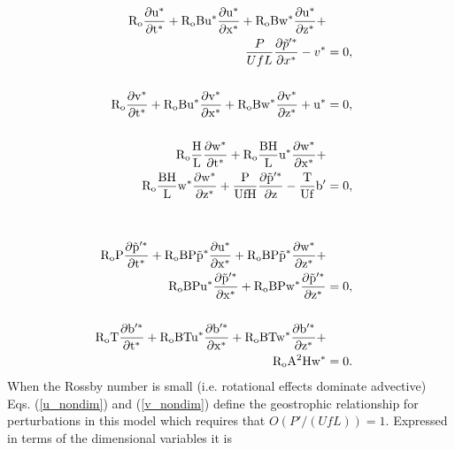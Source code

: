 \documentclass[times]{qjrms4}
\begin{document}
\begin{subequations} \label{non-dimensional}
\begin{align}
\rm{R_o}  \frac{\partial u^*}{\partial t^*} + 
\rm{R_o} B u^* \frac{\partial u^*}{\partial x^*} + 
\rm{R_o} B w^*\frac{\partial u^*}{\partial z^*} +    \nonumber \\
\frac {P}{U f L}  \frac{\partial \tilde{p}'^*}{\partial x^*} 
-  v^* &=  0 , \label{u_nondim}  \\ 
& & \nonumber \\ 
%
\rm{R_o} \frac{\partial v^*}{\partial t^*} + 
\rm{R_o} B u^* \frac{\partial v^*}{\partial x^*} + 
\rm{R_o} B w^*\frac{\partial v^*}{\partial z^*} 
+ u^* &= 0, \label{v_nondim} \\ 
& & \nonumber \\ 
%
\rm{R_o} \frac {H}{L}  \frac{\partial w^*}{\partial t^*} + 
\rm{R_o} \frac {BH}{L}  u^* \frac{\partial w^*}{\partial x^*} + &\nonumber \\
\rm{R_o} \frac {BH}L  w^* \frac{\partial w^*}{\partial z^*} + 
 \frac{P}{UfH} \frac{\partial \tilde{p}'^*}{\partial z} -
 \frac {T} {Uf}  b' &= 0, \label{w_nondim} \\ 
\label{w_nondim}  \\
& & \nonumber \\ 
%
\rm{R_o} P \frac {\partial \tilde{p}'^*}{\partial t^*}  +
\rm{R_o} BP  \tilde{p}^* \frac {\partial u^*}{\partial x^*} +
\rm{R_o} BP  \tilde{p}^* \frac {\partial w^*}{\partial z^*} + & \nonumber \\ 
\rm{R_o} BP u^* \frac {\partial \tilde{p}'^*}{\partial x^*} +
\rm{R_o} BP w^* \frac {\partial \tilde{p}'^*}{\partial z^*} &= 0,  \label{r_nondim}  \\
& & \nonumber \\ 
%
\rm{R_o} T \frac{\partial b'^*}{\partial t^*} + 
\rm{R_o} BT u^* \frac{\partial b'^*}{\partial x^*} + 
\rm{R_o} BT w^* \frac{\partial b'^*}{\partial z^*} + & \nonumber \\ 
\rm{R_o} A^2 H w^* &= 0.  \label{b_nondim}
%
\end{align}
\end{subequations} 
When the Rossby number is small (i.e. rotational effects dominate advective) Eqs. (\ref{u_nondim}) 
and (\ref{v_nondim}) define the geostrophic relationship for perturbations in this model which 
requires that $O \left( {P'}/({UfL}) \right) = 1$. 
Expressed in terms of the dimensional variables it is
\end{document}
